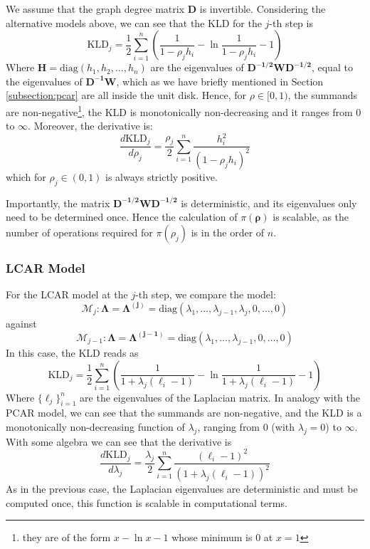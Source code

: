 \documentclass[openany, 11pt, oneside]{book}
\begin{document}
We assume that the graph degree matrix $\boldsymbol{D}$ is invertible. Considering the alternative models above, we can see that the KLD for the $j$-th step is
\begin{equation}
\label{eq:KLD_pcar}
\mathrm{KLD}_j =  \frac{1}{2}\sum_{i=1}^n \left( \frac{1}{1-\rho_j h_i}
- \ln \frac{1}{1 - \rho_j h_i}- 1\right)
\end{equation}
Where $\boldsymbol{H} = \mathrm{diag}\left(h_1, h_2, \dots, h_{n}\right)$ are the eigenvalues of $\boldsymbol{D^{-1/2}WD^{-1/2}}$, equal to the eigenvalues of $\boldsymbol{D^{-1}W}$, which as we have briefly mentioned in Section \ref{subsection:pcar} are all inside the unit disk. Hence, for $\rho \in [0,1)$, the summands are non-negative\footnote{they are of the form $x-\ln x-1$ whose minimum is $0$ at $x=1$}, the KLD is monotonically non-decreasing and it ranges from $0$ to $\infty$. Moreover, the derivative is:
$$
\frac{d\mathrm{KLD}_j}{d \rho_j} =  
 \frac{\rho_j}{2}\sum_{i=1}^n \frac{ h_i^2}{(1-\rho_j h_i)^2}
$$
which for $\rho_j \in (0,1)$ is always strictly positive.

Importantly, the matrix $\boldsymbol{D^{-1/2}WD^{-1/2}}$ is deterministic, and its eigenvalues only need to be determined once. Hence the calculation of $\pi(\boldsymbol{\rho})$ is scalable, as the number of operations required for $\pi(\rho_j)$ is in the order of $n$.


\subsubsection{LCAR Model}
For the LCAR model at the $j$-th step, we compare the model: 
$$\mathcal{M}_j: \boldsymbol{\Lambda} = \boldsymbol{\Lambda^{(j)}} = \mathrm{diag}\left(\lambda_1, \dots, \lambda_{j-1}, \lambda_j, 0, \dots, 0 \right)$$
against 
$$\mathcal{M}_{j-1}: \boldsymbol{\Lambda} = \boldsymbol{\Lambda^{(j-1)}} = \mathrm{diag}\left(\lambda_1, \dots, \lambda_{j-1},0, \dots, 0 \right)$$
In this case, the KLD reads as
\begin{equation}
\mathrm{KLD}_j = \frac{1}{2} \sum_{i=1}^n \left(
\frac{1}{1+\lambda_j (\ell_i-1)} - \ln \frac{1}{1+\lambda_j (\ell_i-1)} - 1 \right)
\label{eq:KLD_LCAR}
\end{equation}
Where $\lbrace \ell_j \rbrace_{i=1}^n$ are the eigenvalues of the Laplacian matrix. In analogy with the PCAR model, we can see that the summands are non-negative, and the KLD is a monotonically non-decreasing function of $\lambda_j$, ranging from 0 (with $\lambda_j=0$) to $\infty$. With some algebra we can see that the derivative is
$$
\frac{d \mathrm{KLD}_j}{d \lambda_j} = \frac{\lambda_j}{2} \sum_{i=1}^n
\frac{ (\ell_i - 1)^2}{(1+\lambda_j (\ell_i - 1) )^2}
$$
As in the previous case, the Laplacian eigenvalues are deterministic and must be computed once, this function is scalable in computational terms.
\end{document}
